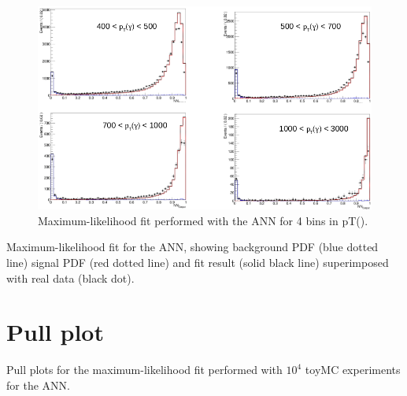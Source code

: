 \documentclass[11pt,a4paper]{report}
\theoremstyle{break}
\begin{document}
\begin{appendix}
\begin{figure}[h!]
    \includegraphics[width=1\textwidth]{fit_pad3}
    \caption{Maximum-likelihood fit performed with the ANN for 4 bins in pT(\textgamma).}
    \label{pull_pad1}
\end{figure}
 Maximum-likelihood fit for the ANN, showing background PDF (blue dotted line) signal PDF (red dotted line) and fit result (solid black line) superimposed with real data (black dot).



    \chapter{Pull plot}

Pull plots for the maximum-likelihood fit performed with $10^4$ toyMC experiments for the ANN.


\end{appendix}
\end{document}
